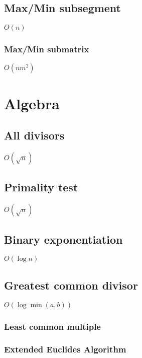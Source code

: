 \documentclass{article}
\begin{document}
\subsection{Max/Min subsegment}
$O(n)$


\subsubsection{Max/Min submatrix}
$O(nm^2)$


\section{Algebra}
\subsection{All divisors}
$O(\sqrt{n})$


\subsection{Primality test}
$O(\sqrt{n})$


\subsection{Binary exponentiation}
$O(\log n)$


\subsection{Greatest common divisor}
$O(\log \min (a, b))$

\subsubsection{Least common multiple}

\subsubsection{Extended Euclides Algorithm}

\end{document}
